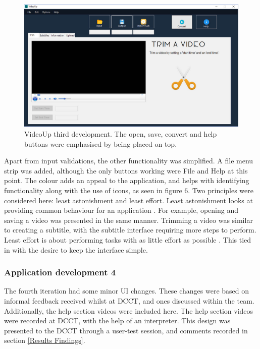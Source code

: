 \documentclass{sig-alternate-05-2015}
\begin{document}
\begin{figure} [h]
\includegraphics[scale=0.21]{dev3}
\caption{VideoUp third development. The open, save, convert and help buttons were emphasised by being placed on top.}
\end{figure}

Apart from input validations, the other functionality was simplified. A file menu strip was added, although the only buttons working were File and Help at this point. The colour adds an appeal to the application, and helps with identifying functionality along with the use of icons, as seen in figure 6. Two principles were considered here: least astonishment and least effort. Least astonishment looks at providing common behaviour for an application \cite{isaksen2006verification}. For example, opening and saving a video was presented in the same manner. Trimming a video was similar to creating a subtitle, with the subtitle interface requiring more steps to perform. Least effort is about performing tasks with as little effort as possible \cite{volker2004thoughts}. This tied in with the desire to keep the interface simple.

\subsubsection{Application development 4}
The fourth iteration had some minor UI changes. These changes were based on informal feedback received whilst at DCCT, and ones discussed within the team. Additionally, the help section videos were included here. The help section videos were recorded at DCCT, with the help of an interpreter. This design was presented to the DCCT through a user-test session, and comments recorded in section \ref{Results Findings}.
\end{document}
